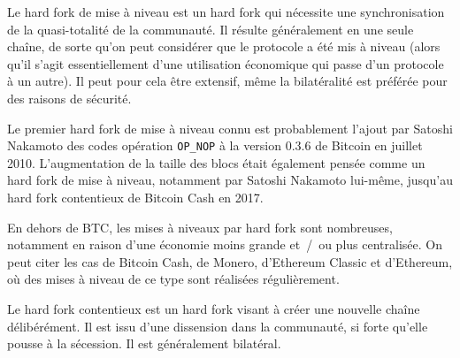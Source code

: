 Le hard fork de mise à niveau est un hard fork qui nécessite une synchronisation de la quasi-totalité de la communauté. Il résulte généralement en une seule chaîne, de sorte qu'on peut considérer que le protocole a été mis à niveau (alors qu'il s'agit essentiellement d'une utilisation économique qui passe d'un protocole à un autre). Il peut pour cela être extensif, même la bilatéralité est préférée pour des raisons de sécurité.

Le premier hard fork de mise à niveau connu est probablement l'ajout par Satoshi Nakamoto des codes opération \texttt{OP\_NOP} à la version 0.3.6 de Bitcoin en juillet 2010. L'augmentation de la taille des blocs était également pensée comme un hard fork de mise à niveau, notamment par Satoshi Nakamoto lui-même, jusqu'au hard fork contentieux de Bitcoin Cash en 2017.

En dehors de BTC, les mises à niveaux par hard fork sont nombreuses, notamment en raison d'une économie moins grande et~/~ou plus centralisée. On peut citer les cas de Bitcoin Cash, de Monero, d'Ethereum Classic et d'Ethereum, où des mises à niveau de ce type sont réalisées régulièrement.

Le hard fork contentieux est un hard fork visant à créer une nouvelle chaîne délibérément. Il est issu d'une dissension dans la communauté, si forte qu'elle pousse à la sécession. Il est généralement bilatéral.

